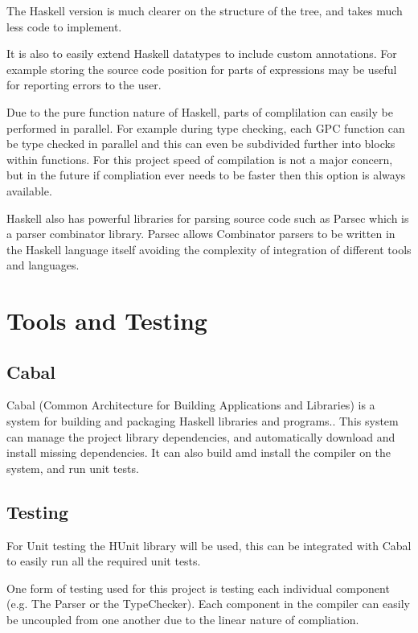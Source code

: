 The Haskell version is much clearer on the structure of the tree, and takes much
less code to implement. 

It is also to easily extend Haskell datatypes to include
custom annotations. For example storing the source code position for parts of expressions may
be useful for reporting errors to the user.

Due to the pure function nature of Haskell, parts of complilation can easily be performed in parallel.
For example during type checking, each GPC function can be type checked in parallel and this can even be subdivided 
further into blocks within functions. For this project speed of compilation is not a major concern, but in the future if compliation ever
needs to be faster then this option is always available.

Haskell also has powerful libraries for parsing source code such as Parsec which is a parser combinator
library. Parsec allows Combinator parsers to be written in the Haskell language itself avoiding the complexity
of integration of different tools and languages\cite{parsec}. 

\section{Tools and Testing}


\subsection{Cabal}

Cabal (Common Architecture for Building Applications and Libraries) is a system for building and
packaging Haskell libraries and programs.\cite{cabal}. This system can manage the
project library dependencies, and automatically download and install missing dependencies.
It can also build amd install the compiler on the system, and run unit tests.

\subsection{Testing}

For Unit testing the HUnit library will be used, this can be integrated
with Cabal to easily run all the required unit tests.

One form of testing used for this project is testing each individual component
(e.g. The Parser or the TypeChecker). Each component in the compiler can easily
be uncoupled from one another due to the linear nature of compliation.

